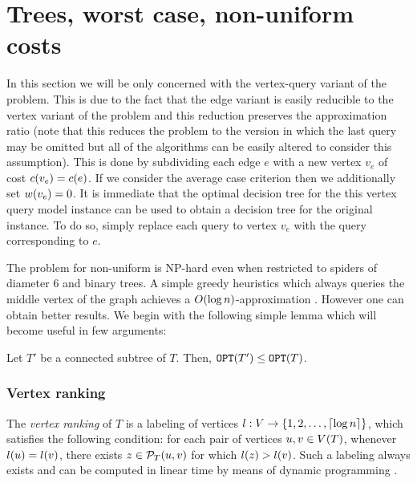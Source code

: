 
\section{Trees, worst case, non-uniform costs}
In this section we will be only concerned with the vertex-query variant of the problem. This is due to the fact that the edge variant is easily reducible to the vertex variant of the problem and this reduction preserves the approximation ratio (note that this reduces the problem to the version in which the last query may be omitted but all of the algorithms can be easily altered to consider this assumption). This is done by subdividing each edge $e$ with a new vertex $v_e$ of cost $c\mathopen{}\left( v_e \right)=c\mathopen{}\left( e \right)$. If we consider the average case criterion then we additionally set $w\mathopen{}\left( v_e \right)=0$. It is immediate that the optimal decision tree for the this vertex query model instance can be used to obtain a decision tree for the original instance. To do so, simply replace each query to vertex $v_e$ with the query corresponding to $e$. 

The problem for non-uniform is NP-hard even when restricted to spiders of diameter $6$ and binary trees.
A simple greedy heuristics which always queries the middle vertex of the graph achieves a $O\mathopen{}\left( \log n \right)$-approximation \cite{Dereniowski2009ERankOfWTs}. However one can obtain better results. 
We begin with the following simple lemma which will become useful in few arguments:
\begin{lemma}\label{lemma:subtreeCost}
    Let $T'$ be a connected subtree of $T$. Then, $\texttt{OPT}\mathopen{}\left( T' \right)\leq\texttt{OPT}\mathopen{}\left( T \right)$.
\end{lemma}

\subsubsection{Vertex ranking}\label{vertexRanking}
The \textit{vertex ranking} of $T$ is a labeling of vertices $l:V\to \mathopen{}\left\{ 1,2,\dots,\mathopen{}\left\lceil \log n \right\rceil \right\}$, which satisfies the following condition: for each pair of vertices $u,v\in V\mathopen{}\left( T \right)$, whenever $l\mathopen{}\left( u \right)=l\mathopen{}\left( v \right)$, there exists $z\in \mathcal{P}_T\mathopen{}\left( u,v \right)$ for which $l\mathopen{}\left( z \right)>l\mathopen{}\left( v \right)$. Such a labeling always exists and can be computed in linear time by means of dynamic programming \cite{Schaffer1989OptNodeRankOfTsInLinTime, OnakParys2006GenOfBSSInTsAndFLikePosets, Mozes_Onak2008FindOptTSStartInLinTime}. 

